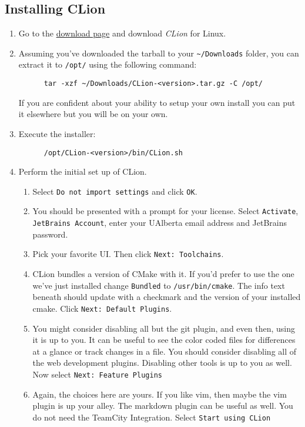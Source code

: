 \documentclass[../setup.tex]{subfiles}
\begin{document}
\subsection{Installing CLion}
\begin{enumerate}
  \item
    Go to the \href{https://www.jetbrains.com/clion/download/\#section=linux} {download page} and
    download \textit{CLion} for Linux.
  \item
    Assuming you've downloaded the tarball to your \lstinline{~/Downloads} folder, you can extract
    it to \lstinline{/opt/} using the following command:
    \begin{lstlisting}
      tar -xzf ~/Downloads/CLion-<version>.tar.gz -C /opt/
    \end{lstlisting}
    If you are confident about your ability to setup your own install you can put it
    elsewhere but you will be on your own.
  \item
    Execute the installer:
    \begin{lstlisting}
      /opt/CLion-<version>/bin/CLion.sh
    \end{lstlisting}
  \item
    Perform the initial set up of CLion.
    \begin{enumerate}
      \item
        Select \texttt{Do not import settings} and click \texttt{OK}.
      \item
        You should be presented with a prompt for your license. Select \texttt{Activate},
        \texttt{JetBrains Account}, enter your UAlberta email address and JetBrains password.
      \item
        Pick your favorite UI. Then click \texttt{Next: Toolchains}.
      \item
        CLion bundles a version of CMake with it. If you'd prefer to use the one we've just
        installed change \texttt{Bundled} to \lstinline{/usr/bin/cmake}. The info text beneath
        should update with a checkmark and the version of your installed cmake. Click
        \texttt{Next: Default Plugins}.
      \item
        You might consider disabling all but the git plugin, and even then, using it is up to you.
        It can be useful to see the color coded files for differences at a glance or track changes
        in a file. You should consider disabling all of the web development plugins. Disabling
        other tools is up to you as well. Now select \texttt{Next: Feature Plugins}
      \item
        Again, the choices here are yours. If you like vim, then maybe the vim plugin is up your
        alley. The markdown plugin can be useful as well. You do not need the TeamCity Integration.
        Select \texttt{Start using CLion}
    \end{enumerate}
\end{enumerate}
\end{document}
